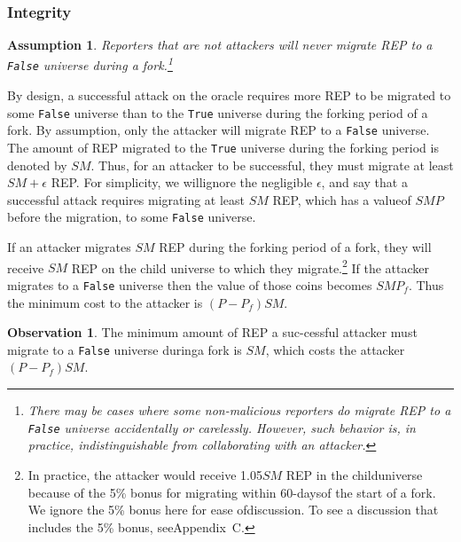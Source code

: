 \documentclass[12pt,floatfix,reprint,nofootinbib,amsmath,amssymb,epsfig,pre,floats,letterpaper,groupedaffiliation]{revtex4-1}
\newtheorem{assumption}{Assumption}
\theoremstyle{definition}
\newtheorem{observation}{Observation}
\theoremstyle{definition}
\begin{document}
\subsubsection{Integrity}

\begin{assumption}
Reporters that are not attackers will never migrate REP to a \texttt{False} universe during a fork.\footnote{There may be cases where some non-malicious reporters do migrate REP to a \texttt{False} universe accidentally or carelessly. However, such behavior is, in practice, indistinguishable from collaborating with an attacker.}
\end{assumption}

By design, a successful attack on the oracle requires more REP to be migrated to some \texttt{False} universe than to the \texttt{True} universe during the forking period of a fork. By assumption, only the attacker will migrate REP to a \texttt{False} universe. The amount of REP migrated to the \texttt{True} universe during the forking period is denoted by $SM$. Thus, for an attacker to be successful, they must migrate at least $SM + \epsilon$ REP. For simplicity, we will\linebreak ignore the negligible $\epsilon$, and say that a successful attack requires migrating at least $SM$ REP, which has a value\linebreak of $SMP$ before the migration, to some \texttt{False} universe.

If an attacker migrates $SM$ REP during the forking period of a fork, they will receive $SM$ REP on the child universe to which they migrate.\footnote{In practice, the attacker would receive 1.05$SM$ REP in the child\linebreak universe because of the 5\% bonus for migrating within 60-days\linebreak of the start of a fork. We ignore the 5\% bonus here for ease of\linebreak discussion. To see a discussion that includes the 5\% bonus, see\linebreak Appendix~C.} If the attacker mi\-grates to a \texttt{False} universe then the value of those coins becomes $SMP_f$. Thus the minimum cost to the attacker is $(P - P_f)SM$.

\begin{observation}
The minimum amount of REP a suc-\linebreak cessful attacker must migrate to a \texttt{False} universe during\linebreak a fork is $SM$, which costs the attacker $(P - P_f)SM$.
\end{observation}
\end{document}
